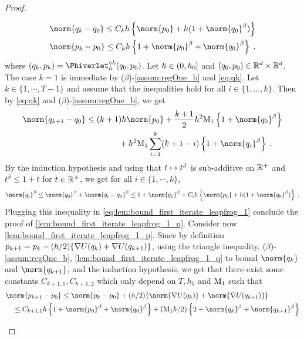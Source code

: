 \begin{proof}
\begin{enumerate}[label={(\roman*)},wide=0pt, labelindent=\parindent]
\begin{equation}
\begin{aligned}
\norm{q_k-q_0} \leq C_k h\defEns{  \norm{p_0} +h(1+ \norm{q_0}^{\expozero})} \\
\norm{p_k-p_0} \leq C_k h \defEns{ 1 + \norm{p_0}^{\expozero} + \norm{q_0}^{\expozero}} \eqsp.
\end{aligned}
\end{equation}
  where $(q_k,p_k) = \Phiverlet^{\circ k}_{h}(q_0,p_0)$.
 Let $ h \in \left(0, h_0\right]$ and $(q_0,p_0) \in \mathbb{R}^d \times
    \mathbb{R}^d$.
 The case $k=1$ is immediate by
($\beta$)-\ref{assum:regOne_b} and \eqref{eq:qk}. Let $k \in \{1,\cdots,
T-1\}$ and assume that the inequalities hold for all $i \in
\{1,\dots, k\}$. Then by \eqref{eq:qk} and
($\beta$)-\ref{assum:regOne_b}, we get
\begin{align}
\label{eq:lem:bound_first_iterate_leapfrog_1}
\norm{q_{k+1}-q_0}
&\leq (k+1)h \norm{p_0}+\frac{k+1}{2}h^2 \constzeroT  \defEns{1+\norm{ q_0}^{\expozero} }\\
&\qquad \qquad +h^2 \constzeroT \sum_{i=1}^{k}(k+1-i)\defEns{1+ \norm{q_i}^{\expozero} }\eqsp.
\end{align}
By the induction hypothesis and using that $t \mapsto t^{\beta}$ is sub-additive on $\mathbb{R}^+$ and $t^\beta \leq 1 + t$ for $t \in \mathbb{R}^+$, we get for all $i \in \{1,\cdots, k\}$,
\begin{equation}
\norm{q_i}^{\expozero} \leq \norm{q_0}^{\expozero} + \norm{q_i-q_0}^\beta \leq 1+ \norm{q_0}^{\expozero} +C_i h\defEns{\norm{p_0}+h(1+ \norm{q_0}^{\expozero})} \eqsp,
\end{equation}
Plugging this inequality in \eqref{eq:lem:bound_first_iterate_leapfrog_1}
conclude the proof of \eqref{lem:bound_first_iterate_leapfrog_1_q}.
Consider now \eqref{lem:bound_first_iterate_leapfrog_1_p}. Since by
definition $p_{k+1} = p_k-(h/2)\lbrace \nabla U(q_{k}) + \nabla
  U(q_{k+1}) \rbrace$, using the triangle inequality,
($\beta$)-\ref{assum:regOne_b},
\eqref{lem:bound_first_iterate_leapfrog_1_q} to bound $\norm{q_{k}}$ and
$\norm{q_{k+1}}$, and the induction hypothesis, we get that there exist some
constants $C_{k+1,1},C_{k+1,2}$ which only depend on $T,h_0$ and
$\mathrm{M}_1$ such that
\begin{align}
&  \norm{p_{k+1} - p_0} \leq \norm{p_k-p_0} + (h/2)\defEnsLigne{\norm{\nabla \F(q_{k})} + \norm{\nabla \F(q_{k+1})}} \\
&\quad \leq C_{k+1,1}h\defEns{1+\norm{p_0}^{\expozero}+\norm{q_0}^{\expozero}} + (\constzeroT h/2)\defEns{2+\norm{q_{k}}^{\expozero}+ \norm{q_{k+1}}^{\expozero}}\\

\end{align}
\end{enumerate}
\end{proof}

